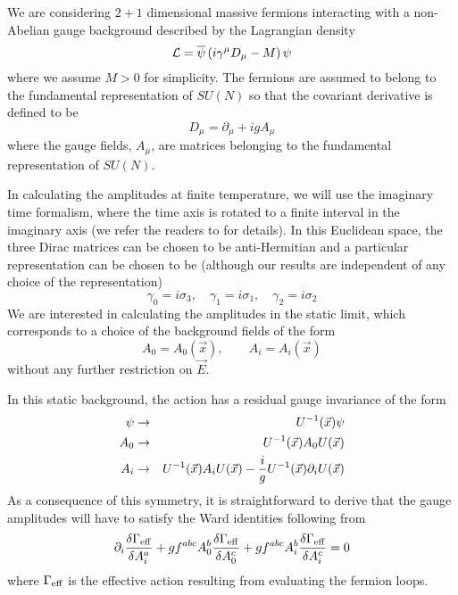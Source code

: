 \documentclass[a4paper,12pt]{article}
\begin{document}
We are considering $2+1$ dimensional massive fermions interacting with a
non-Abelian gauge background described by the Lagrangian density
\begin{equation}
{\cal L} = \overline{\psi}\left(i\gamma^{\mu}D_{\mu} - M\right)\psi
\end{equation}
where we assume $M>0$ for simplicity. The fermions are assumed to belong to the
fundamental representation of $SU(N)$ so that the covariant derivative is
defined to be
\[
D_{\mu} = \partial_{\mu} + ig A_{\mu}
\]
where the gauge fields, $A_{\mu}$, are matrices belonging to the
fundamental representation of $SU(N)$.

In calculating the amplitudes at finite temperature, we will use the
imaginary time formalism, where the time axis is rotated to a finite
interval in the imaginary axis (we refer the readers 
to \cite{das:book97,kapusta:book89,lebellac:book96} for details). In
this  Euclidean space,  the three Dirac matrices can be
chosen to be anti-Hermitian and a particular representation can be
chosen to be (although our results are independent of any choice of
the representation)
\[
\gamma_{0} = i\sigma_{3},\quad \gamma_{1} = i\sigma_{1},\quad
\gamma_{2} = i\sigma_{2}
\]
We are interested in calculating the amplitudes in the static limit,
which corresponds to a choice of the background fields of the form
\begin{equation}
A_{0} = A_{0}(\vec{x}),\qquad A_{i} = A_{i}(\vec{x})\label{2}
\end{equation}
without any further restriction on $\vec{E}$.

In this static background, the action has a residual gauge invariance
of the form  
\begin{eqnarray}
\psi & \rightarrow & U^{-1}(\vec{x})\psi\nonumber\\
A_{0} & \rightarrow & U^{-1}(\vec{x})A_{0}U(\vec{x})\nonumber\\
A_{i} & \rightarrow & U^{-1}(\vec{x})A_{i}U(\vec{x}) - {i\over g}
U^{-1}(\vec{x})\partial_{i}U(\vec{x})\label{2a} 
\end{eqnarray}
As a consequence of this symmetry, it is straightforward to derive
that the gauge amplitudes will have to satisfy the Ward identities
following from
\begin{equation}
\partial_{i}{\delta\Gamma_{\rm eff}\over \delta A_{i}^{a}} + gf^{abc}
A_{0}^{b} {\delta\Gamma_{\rm eff}\over \delta A_{0}^{c}} + gf^{abc}
A_{i}^{b} {\delta\Gamma_{\rm eff}\over \delta A_{i}^{c}} = 0\label{2b}
\end{equation}
where $\Gamma_{\rm eff}$ is the effective action resulting from evaluating
the fermion loops.
\end{document}
